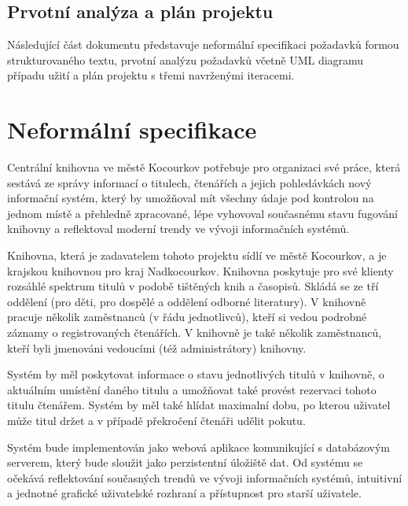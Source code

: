\documentclass[11pt, a4paper, titlepage]{article}
\begin{document}
	
	\pagestyle{fancy}

	\begin{center}
		\section*{Prvotní analýza a plán projektu}
	\end{center}

	\noindent Následující část dokumentu představuje neformální specifikaci požadavků formou
	strukturovaného textu, prvotní analýzu požadavků včetně UML diagramu případu užití a plán
	projektu s třemi navrženými iteracemi.

	\section*{Neformální specifikace}

	Centrální knihovna ve městě Kocourkov potřebuje pro organizaci své práce, která sestává ze 		správy informací o titulech, čtenářích a jejich pohledávkách nový informační systém, který by
	umožňoval mít všechny údaje pod kontrolou na jednom místě a přehledně zpracované, lépe 	
	vyhovoval současnému stavu fugování knihovny a reflektoval moderní trendy ve vývoji
	informačních systémů.

	Knihovna, která je zadavatelem tohoto projektu sídlí ve městě Kocourkov, a je krajskou 
	knihovnou pro kraj Nadkocourkov. Knihovna poskytuje pro své klienty rozsáhlé spektrum titulů v
	podobě tištěných knih a časopisů. Skládá se ze tří oddělení (pro děti, pro dospělé a oddělení
	odborné literatury). V knihovně pracuje několik zaměstnanců (v řádu jednotlivců), kteří si
	vedou podrobné záznamy o registrovaných čtenářích. V knihovně je také několik zaměstnanců, kteří
	byli jmenováni vedoucími (též administrátory) knihovny. 

	Systém by měl poskytovat informace o stavu jednotlivých titulů v knihovně, o aktuálním umístění 	daného titulu a umožňovat také provést rezervaci tohoto titulu čtenářem. Systém by měl také 
	hlídat maximalní dobu, po kterou uživatel může titul držet a v případě překročení čtenáři 
	udělit pokutu.

	Systém bude implementován jako webová aplikace komunikující s databázovým serverem, který bude
	sloužit jako perzistentní úložiště dat. Od systému se očekává reflektování současných trendů ve
	vývoji informačních systémů, intuitivní a jednotné grafické uživatelské rozhraní a přístupnost
	pro starší uživatele.
\end{document}
